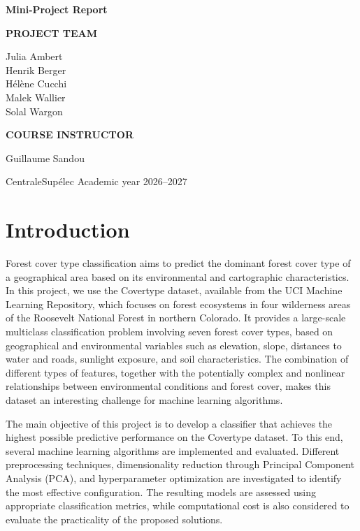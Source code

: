 \documentclass[10pt,a4paper]{article}
\newcommand{\Authors}{Julia Ambert \\ Henrik Berger \\ Hélène Cucchi \\ Malek Wallier \\ Solal Wargon}
\newcommand{\AcademicYear}{2026--2027}
\begin{document}
{\large\bfseries Mini-Project Report}\par

\vfill

\noindent
\begin{minipage}[t]{0.53\textwidth}
    {\small\bfseries\color{deepblue} PROJECT TEAM}\par
    \vspace{0.20cm}
    {\normalsize\Authors}
\end{minipage}
\hfill
\begin{minipage}[t]{0.39\textwidth}
    {\small\bfseries\color{deepblue} COURSE INSTRUCTOR}\par
    \vspace{0.20cm}
    Guillaume Sandou
\end{minipage}

\vspace{1.0cm}

{\small\color{muted}
CentraleSup\'elec \hfill Academic year \AcademicYear}\par

\vspace{0.75cm}
\clearpage



\section{Introduction}

Forest cover type classification aims to predict the dominant forest cover type of a geographical area based on its environmental and cartographic characteristics. In this project, we use the Covertype dataset, available from the UCI Machine Learning Repository, which focuses on forest ecosystems in four wilderness areas of the Roosevelt National Forest in northern Colorado. It provides a large-scale multiclass classification problem involving seven forest cover types, based on geographical and environmental variables such as elevation, slope, distances to water and roads, sunlight exposure, and soil characteristics. The combination of different types of features, together with the potentially complex and nonlinear relationships between environmental conditions and forest cover, makes this dataset an interesting challenge for machine learning algorithms.

The main objective of this project is to develop a classifier that achieves the highest possible predictive performance on the Covertype dataset. To this end, several machine learning algorithms are implemented and evaluated. Different preprocessing techniques, dimensionality reduction through Principal Component Analysis (PCA), and hyperparameter optimization are investigated to identify the most effective configuration. The resulting models are assessed using appropriate classification metrics, while computational cost is also considered to evaluate the practicality of the proposed solutions.
\end{document}
